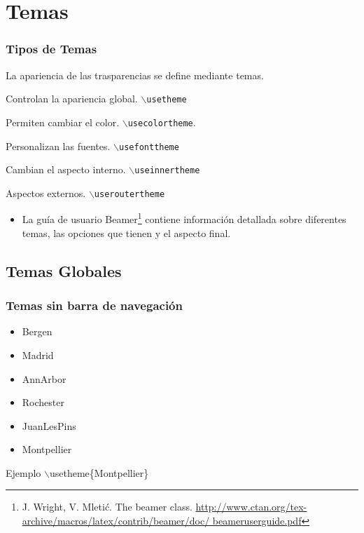 \documentclass[aspectratio=1610]{beamer}%
\begin{document}
\section{Temas}
\begin{frame}[fragile]
\frametitle{\textbf{Tipos de Temas}}
\justifying
 La apariencia de las trasparencias se define mediante temas.
\begin{description}\justifying
  \item[Globales] Controlan la apariencia global. \texttt{$\backslash$usetheme}
  \item[Color] Permiten cambiar el color. \texttt{$\backslash$usecolortheme}.
  \item[Fuentes] Personalizan las fuentes. \texttt{$\backslash$usefonttheme}
  \item[Internos] Cambian el aspecto interno. \texttt{$\backslash$useinnertheme}
  \item[Externos] Aspectos externos. \texttt{$\backslash$useroutertheme}
\end{description}
\begin{itemize}\justifying
  \item La guía de usuario Beamer\footnote{J. Wright, V. Mleti\'c. The beamer class. \url{http://www.ctan.org/tex-archive/macros/latex/contrib/beamer/doc/ beameruserguide.pdf}} contiene información detallada sobre diferentes temas, las opciones que tienen y el aspecto final.
\end{itemize}

\end{frame}

\subsection{Temas Globales}
\begin{frame}[fragile]
\frametitle{\textbf{Temas sin barra de navegación}}
\justifying
 \begin{itemize}\justifying
  \item Bergen
  \item Madrid
  \item AnnArbor
  \item Rochester
  \item JuanLesPins
  \item Montpellier
\end{itemize}
\begin{block}{Ejemplo}
$\backslash$usetheme\{Montpellier\}
\end{block}
\end{frame}
\end{document}
